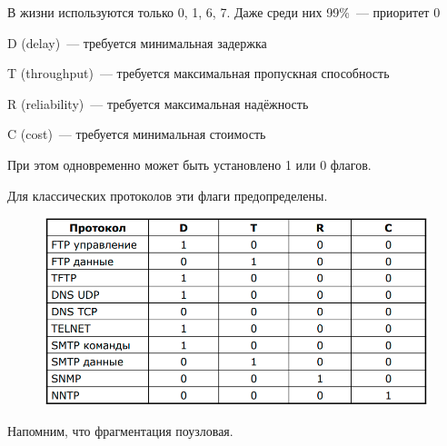 \begin{MyItemize}
\begin{MyItemize}
        В жизни используются только 0, 1, 6, 7. Даже среди них 99\%~--- приоритет 0

        \item D (delay)~--- требуется минимальная задержка
        \item T (throughput)~--- требуется максимальная пропускная способность
        \item R (reliability)~--- требуется максимальная надёжность
        \item C (cost)~--- требуется минимальная стоимость
    \end{MyItemize}

    При этом одновременно может быть установлено 1 или 0 флагов.

    Для классических протоколов эти флаги предопределены.

    \begin{figure}[H]
        \centering
        \includegraphics[width=15cm]{images/02/03}
    \end{figure}
\end{MyItemize}


Напомним, что фрагментация поузловая.

